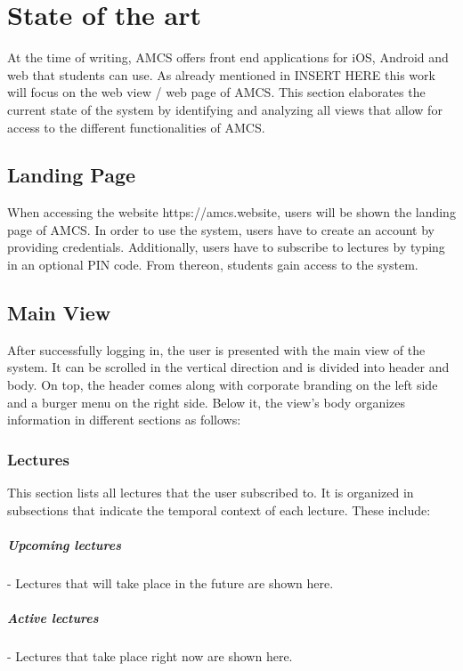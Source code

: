 \chapter{State of the art}

At the time of writing, AMCS offers front end applications for iOS, Android and web that students can use. As already mentioned in \todo INSERT HERE this work will focus on the web view / web page of AMCS.
This section elaborates the current state of the system by identifying and analyzing all views that allow for access to the different functionalities of AMCS. 


\section{Landing Page}
When accessing the website https://amcs.website, users will be shown the landing page of AMCS.
In order to use the system, users have to create an account by providing credentials. Additionally, users have to subscribe to lectures by typing in an optional PIN code. From thereon, students gain access to the system. 
\todogrf
 
\section{Main View}
After successfully logging in, the user is presented with the main view of the system.
It can be scrolled in the vertical direction and is divided into header and body. On top, the header comes along with corporate branding on the left side and a burger menu on the right side. Below it, the view's body organizes information in different sections as follows:

\todogrf

\subsection{Lectures}

This section lists all lectures that the user subscribed to. It is organized in subsections that indicate the temporal context of each lecture. These include:

\paragraph{Upcoming lectures} - Lectures that will take place in the future are shown here.
\paragraph{Active lectures} - Lectures that take place right now are shown here.
